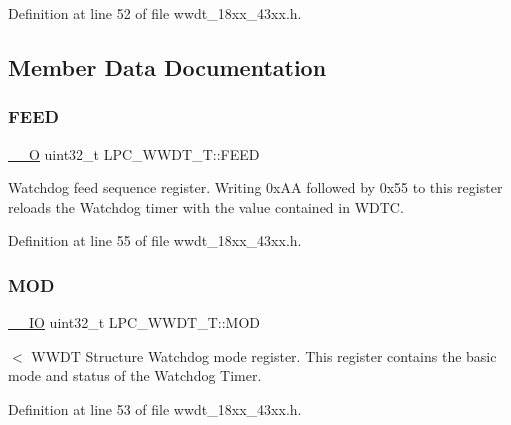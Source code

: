 Definition at line 52 of file wwdt\+\_\+18xx\+\_\+43xx.\+h.



\subsection{Member Data Documentation}
\mbox{\label{struct_l_p_c___w_w_d_t___t_a80b357a30f90ba82fd46ff1faa8fe4b8}} 
\subsubsection{\texorpdfstring{F\+E\+ED}{FEED}}
{\footnotesize\ttfamily \hyperlink{core__sc300_8h_a7e25d9380f9ef903923964322e71f2f6}{\+\_\+\+\_\+O} uint32\+\_\+t L\+P\+C\+\_\+\+W\+W\+D\+T\+\_\+\+T\+::\+F\+E\+ED}

Watchdog feed sequence register. Writing 0x\+AA followed by 0x55 to this register reloads the Watchdog timer with the value contained in W\+D\+TC. 

Definition at line 55 of file wwdt\+\_\+18xx\+\_\+43xx.\+h.

\mbox{\label{struct_l_p_c___w_w_d_t___t_a92ea6cd2032ed81f7c5f626b48c4c772}} 
\subsubsection{\texorpdfstring{M\+OD}{MOD}}
{\footnotesize\ttfamily \hyperlink{core__sc300_8h_aec43007d9998a0a0e01faede4133d6be}{\+\_\+\+\_\+\+IO} uint32\+\_\+t L\+P\+C\+\_\+\+W\+W\+D\+T\+\_\+\+T\+::\+M\+OD}

$<$ W\+W\+DT Structure Watchdog mode register. This register contains the basic mode and status of the Watchdog Timer. 

Definition at line 53 of file wwdt\+\_\+18xx\+\_\+43xx.\+h.

\mbox{\label{struct_l_p_c___w_w_d_t___t_af47cdcbd1ae7b068bf6b66566a140aa6}} 
